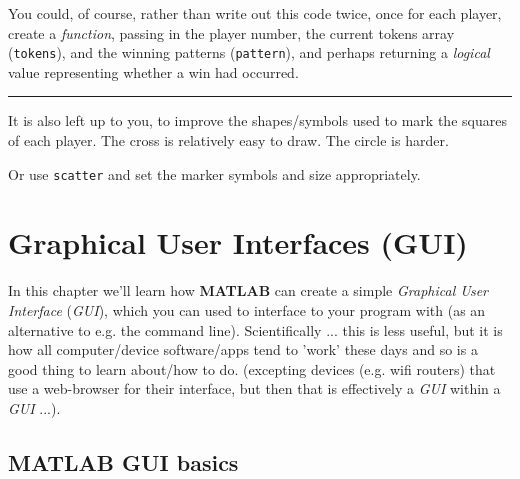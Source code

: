 \documentclass{tufte-book} %
\begin{document}
You could, of course, rather than write out this code twice, once for each player, create a \textit{function}, passing in the player number, the current tokens array (\texttt{tokens}), and the winning patterns (\texttt{pattern}), and perhaps returning a \textit{logical} value representing whether a win had occurred.

\vspace{1mm}
\noindent\rule{4cm}{0.5pt}
\vspace{2mm}

\noindent It is also left up to you, to improve the shapes/symbols used to mark the squares of each player. The cross is relatively easy to draw. The circle is harder.

Or use \texttt{scatter} and set the marker symbols and size appropriately.


\chapter{Graphical User Interfaces (GUI)}
\label{ch:09}


\begin{fullwidth}

In this chapter we'll learn how \textbf{MATLAB} can create a simple \textit{Graphical User Interface} (\textit{GUI}), which you can used to interface to your program with (as an alternative to e.g. the command line). Scientifically ... this is less useful, but it is how all computer/device software/apps tend to 'work' these days and so is a good thing to learn about/how to do. (excepting devices (e.g. wifi routers) that use a web-browser for their interface, but then that is effectively a \textit{GUI} within a \textit{GUI} ...).

\end{fullwidth}


\newpage


\section{\textbf{MATLAB} GUI basics}
\end{document}
